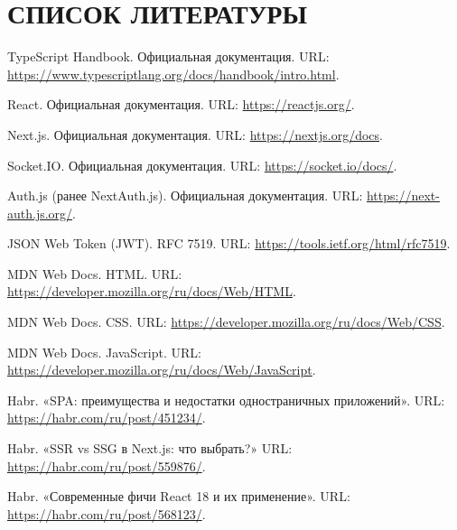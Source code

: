 \section*{СПИСОК ЛИТЕРАТУРЫ}
\vspace{-1.5\baselineskip}

\begingroup
  \let\clearpage\relax
  \let\newpage\relax
    \renewcommand{\addcontentsline}[3]{}
  \renewcommand{\refname}{}

  \begin{thebibliography}{99}

    TypeScript Handbook. Официальная документация. URL: \url{https://www.typescriptlang.org/docs/handbook/intro.html}.
    
    React. Официальная документация. URL: \url{https://reactjs.org/}.

    Next.js. Официальная документация. URL: \url{https://nextjs.org/docs}.

    Socket.IO. Официальная документация. URL: \url{https://socket.io/docs/}.

    Auth.js (ранее NextAuth.js). Официальная документация. URL: \url{https://next-auth.js.org/}.

    JSON Web Token (JWT). RFC 7519. URL: \url{https://tools.ietf.org/html/rfc7519}.

    MDN Web Docs. HTML. URL: \url{https://developer.mozilla.org/ru/docs/Web/HTML}.

    MDN Web Docs. CSS. URL: \url{https://developer.mozilla.org/ru/docs/Web/CSS}.

    MDN Web Docs. JavaScript. URL: \url{https://developer.mozilla.org/ru/docs/Web/JavaScript}.

    Habr. «SPA: преимущества и недостатки одностраничных приложений». URL: \url{https://habr.com/ru/post/451234/}.

    Habr. «SSR vs SSG в Next.js: что выбрать?» URL: \url{https://habr.com/ru/post/559876/}.

    Habr. «Современные фичи React 18 и их применение». URL: \url{https://habr.com/ru/post/568123/}.


\end{thebibliography}
